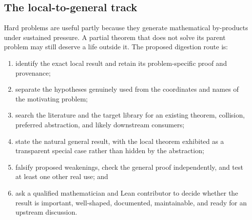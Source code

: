 \documentclass[10pt]{article}
\begin{document}
\subsection{The local-to-general track}\label{sec:local-to-general}

Hard problems are useful partly because they generate mathematical by-products
under sustained pressure.  A partial theorem that does not solve its parent
problem may still deserve a life outside it.  The proposed digestion route is:

\begin{enumerate}
\item identify the exact local result and retain its problem-specific proof and
      provenance;
\item separate the hypotheses genuinely used from the coordinates and names of
      the motivating problem;
\item search the literature and the target library for an existing theorem,
      collision, preferred abstraction, and likely downstream consumers;
\item state the natural general result, with the local theorem exhibited as a
      transparent special case rather than hidden by the abstraction;
\item falsify proposed weakenings, check the general proof independently, and
      test at least one other real use; and
\item ask a qualified mathematician and Lean contributor to decide whether the
      result is important, well-shaped, documented, maintainable, and ready for
      an upstream discussion.
\end{enumerate}
\end{document}
